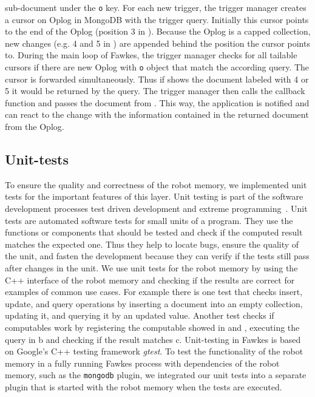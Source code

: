 sub-document under the \texttt{o} key. For each new trigger, the
trigger manager creates a cursor on Oplog in MongoDB with the trigger
query. Initially this cursor points to the end of the Oplog (position
3 in ). Because the Oplog is a capped
collection, new changes (e.g. 4 and 5 in )
are appended behind the position the cursor points to. During the main
loop of Fawkes, the trigger manager checks for all tailable cursors if
there are new Oplog with \texttt{o} object that match the according
query. The cursor is forwarded simultaneously. Thus if
 shows the document labeled with 4 or 5 it would be
returned by the query.
The trigger manager then calls the callback function and passes the
document from . This way, the application is
notified and can react to the change with the information contained in
the returned document from the Oplog.

\subsection{Unit-tests}
\label{sec:impl-unittests}
To ensure the quality and correctness of the robot memory, we
implemented unit tests for the important features of this layer. Unit
testing is part of the software development processes test driven
development and extreme programming~\cite{beck-test,beck-xp}. Unit
tests are automated software tests for small units of a program. They
use the functions or components that should be tested and check if the
computed result matches the expected one. Thus they help to locate
bugs, ensure the quality of the unit, and fasten the development
because they can verify if the tests still pass after changes in the
unit. We use unit tests for the robot memory by using the C++
interface of the robot memory and checking if the results are correct
for examples of common use cases. For example there is one test that
checks insert, update, and query operations by inserting a document
into an empty collection, updating it, and querying it by an updated
value. Another test checks if computables work by registering the
computable showed in  and ,
executing the query in b and checking if the result
matches c. Unit-testing in Fawkes is based on Google's
C++ testing framework \emph{gtest}. To test the functionality of the
robot memory in a fully running Fawkes process with dependencies of
the robot memory, such as the \texttt{mongodb} plugin, we integrated
our unit tests into a separate plugin that is started with the robot
memory when the tests are executed.

